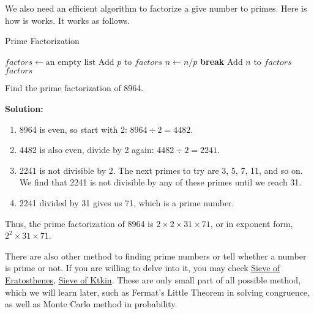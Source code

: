         We also need an efficient algorithm to factorize a give number to primes. Here is how is
        works. It works as follows.
        \begin{algorithm}
            \caption{Prime Factorization}
            \begin{algorithmic}[H]
            
                \State $factors \gets \text{an empty list}$
                        \State Add $p$ to $factors$
                        \State $n \gets n / p$
                    \EndWhile
                        \State \textbf{break}
                    \EndIf
                \EndFor
                    \State Add $n$ to $factors$
                \EndIf
                \State \Return $factors$
            \EndFunction
            
            \end{algorithmic}
            \end{algorithm}
        \begin{example}
            Find the prime factorization of 8964.
        \end{example}
        \textbf{Solution:}

        \begin{enumerate}
            \item 8964 is even, so start with 2: \( 8964 \div 2 = 4482 \).
            \item 4482 is also even, divide by 2 again: \( 4482 \div 2 = 2241 \).
            \item 2241 is not divisible by 2. The next primes to try are 3, 5, 7, 11, and so on. We find that 2241 is not divisible by any of these primes until we reach 31.
            \item 2241 divided by 31 gives us 71, which is a prime number.
        \end{enumerate}
        
        Thus, the prime factorization of 8964 is \( 2 \times 2 \times 31 \times 71 \), or in exponent form, \( 2^2 \times 31 \times 71 \).

        There are also other method to finding prime numbers or tell whether a number is prime or not. If you are willing
        to delve into it, you may check \href{https://en.wikipedia.org/wiki/Sieve_of_Eratosthenes}{Sieve of Eratosthenes}, 
        \href{https://en.wikipedia.org/wiki/Sieve_of_Atkin}{Sieve of Ktkin}. These are only small part of all possible method,
        which we will learn later, such as Fermat's Little Theorem in solving congruence, as well as Monte Carlo method in probability.


